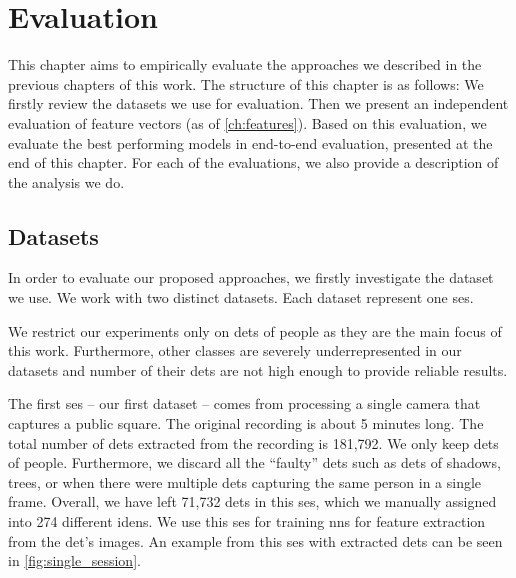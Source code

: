 \chapter{Evaluation}


\label{ch:evaluation}

This chapter aims to empirically evaluate the approaches we described
in the previous chapters of this work. The structure of this chapter is as follows:
We firstly review the datasets we use for evaluation. Then we present an independent
evaluation of feature vectors (as of \autoref{ch:features}). Based on this evaluation, 
we evaluate the best performing models in end-to-end evaluation, presented
at the end of this chapter. For each of the evaluations, we also provide a description of the analysis we do.

\section{Datasets}

\label{sec:datasets}

In order to evaluate our proposed approaches, we firstly investigate the dataset we use. We work with two distinct datasets. Each dataset represent one \gls{ses}.

We restrict our experiments only on \glspl{det} of people as they are the main focus of this work. Furthermore, other classes are severely underrepresented in our datasets and number of their \glspl{det} are not high enough to provide reliable results.

The first \gls{ses} -- our first dataset -- comes from processing a single camera that captures a public square. The original recording is about 5 minutes long. The total number of \glspl{det} extracted from the recording is 181,792. We only keep \glspl{det} of people. Furthermore, we discard all the ``faulty'' \glspl{det} such as \glspl{det} of shadows, trees, or when there were multiple \glspl{det} capturing the same person in a single frame. Overall, we have left 71,732 \glspl{det} in this \gls{ses}, which we manually assigned into 274 different \glspl{iden}. We use this \gls{ses} for training \glspl{nn} for feature extraction from the \gls{det}'s images. An example from this \gls{ses} with extracted \glspl{det} can be seen in \autoref{fig:single_session}.

